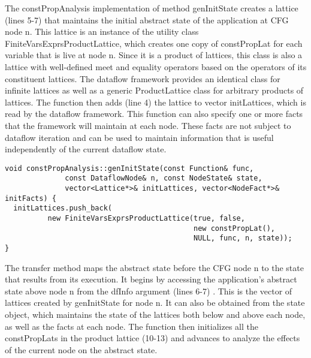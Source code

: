 {The {\scriptsize constPropAnalysis} implementation of method {\scriptsize genInitState} creates a lattice (lines 5-7) that maintains the initial abstract state of the application at CFG node {\scriptsize n}. This lattice is an instance of the utility class {\scriptsize FiniteVarsExprsProductLattice}, which creates one copy of {\scriptsize constPropLat} for each variable that is live at node {\scriptsize n}. Since it is a product of lattices, this class is also a lattice with well-defined meet and equality operators based on the operators of its constituent lattices. The dataflow framework provides an identical class for infinite lattices as well as a generic ProductLattice class for arbitrary products of lattices. The function then adds (line 4) the lattice to vector initLattices, which is read by the dataflow framework. This function can also specify one or more facts that the framework will maintain at each node. These facts are not subject to dataflow iteration and can be used to maintain information that is useful independently of the current dataflow state.
 

\begin{frame}
\centering
\begin{lstlisting}
void constPropAnalysis::genInitState(const Function& func, 
              const DataflowNode& n, const NodeState& state,
              vector<Lattice*>& initLattices, vector<NodeFact*>& initFacts) {
  initLattices.push_back(
          new FiniteVarsExprsProductLattice(true, false,  
                                            new constPropLat(), 
                                            NULL, func, n, state));
}
\end{lstlisting}%
\end{frame}

The {\scriptsize transfer} method maps the abstract state before the CFG node n to the state that results from its execution. It begins by accessing the application’s abstract state above node n from the {\scriptsize dfInfo} argument (lines 6-7) . This is the vector of lattices created by {\scriptsize genInitState} for node {\scriptsize n}. It can also be obtained from the {\scriptsize state} object, which maintains the state of the lattices both below and above each node, as well as the facts at each node. The function then initializes all the {\scriptsize constPropLats} in the product lattice (10-13) and advances to analyze the effects of the current node on the abstract state.

}
